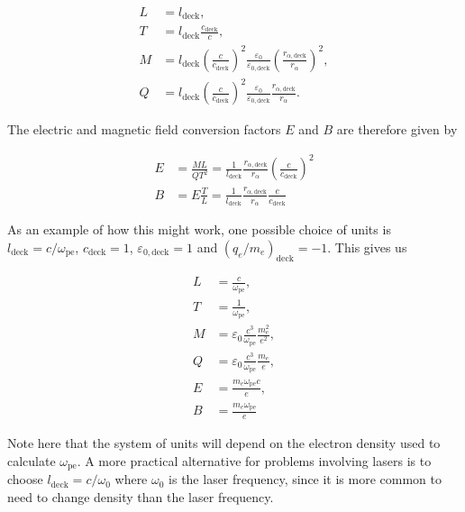 \documentclass[twocolumn,10pt]{article}
\begin{document}
	\begin{align}
		L &= l_{\mathrm{deck}}, \\
		T &= l_{\mathrm{deck}}\frac{c_{\mathrm{deck}}}{c}, \\
		M &= l_{\mathrm{deck}}\left(\frac{c}{c_{\mathrm{deck}}}\right)^2\frac{\varepsilon_0}{\varepsilon_{0,\mathrm{deck}}}\left(\frac{r_{\alpha,\mathrm{deck}}}{r_{\alpha}}\right)^2, \\
		Q &= l_{\mathrm{deck}}\left(\frac{c}{c_{\mathrm{deck}}}\right)^2\frac{\varepsilon_0}{\varepsilon_{0,\mathrm{deck}}}\frac{r_{\alpha,\mathrm{deck}}}{r_{\alpha}}.
	\end{align}

	\noindent The electric and magnetic field conversion factors $E$ and $B$ are therefore given by

	\begin{align}
		E &= \frac{ML}{QT^2} = \frac{1}{l_{\mathrm{deck}}}\frac{r_{\alpha,\mathrm{deck}}}{r_{\alpha}}\left(\frac{c}{c_{\mathrm{deck}}}\right)^2 \\
		B &= E\frac{T}{L} = \frac{1}{l_{\mathrm{deck}}}\frac{r_{\alpha,\mathrm{deck}}}{r_{\alpha}}\frac{c}{c_{\mathrm{deck}}}
	\end{align}

	As an example of how this might work, one possible choice of units is $l_{\mathrm{deck}} = c/\omega_{\mathrm{pe}}$, $c_{\mathrm{deck}} = 1$, $\varepsilon_{0,\mathrm{deck}} = 1$ and $(q_e/m_e)_{\mathrm{deck}} = -1$. This gives us

	\begin{align}
		L &= \frac{c}{\omega_{\mathrm{pe}}}, \\
		T &= \frac{1}{\omega_{\mathrm{pe}}}, \\
		M &= \varepsilon_0\frac{c^3}{\omega_{\mathrm{pe}}}\frac{m_e^2}{e^2}, \\
		Q &= \varepsilon_0\frac{c^3}{\omega_{\mathrm{pe}}}\frac{m_e}{e}, \\
		E &= \frac{m_e\omega_{\mathrm{pe}}c}{e}, \\
		B &= \frac{m_e\omega_{\mathrm{pe}}}{e}
	\end{align}

	\noindent Note here that the system of units will depend on the electron density used to calculate $\omega_{\mathrm{pe}}$. A more practical alternative for problems involving lasers is to choose $l_{\mathrm{deck}}=c/\omega_0$ where $\omega_0$ is the laser frequency, since it is more common to need to change density than the laser frequency.
\end{document}
